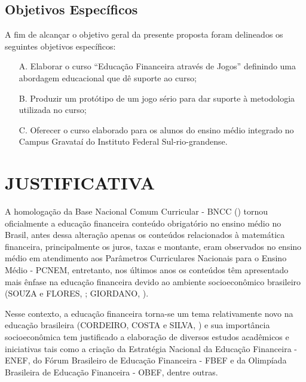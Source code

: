 \subsection{Objetivos Específicos}
A fim de alcançar o objetivo geral da presente proposta foram delineados os seguintes objetivos específicos:

\begin{enumerate}
    \item [A.] Elaborar o curso “Educação Financeira através de Jogos” definindo uma abordagem educacional que dê suporte ao curso;
    \item [B.] Produzir um protótipo de um jogo sério para dar suporte à metodologia utilizada no curso;
    \item [C.] Oferecer o curso elaborado para os alunos do ensino médio integrado no Campus Gravataí do Instituto Federal Sul-rio-grandense.
\end{enumerate}

\section{JUSTIFICATIVA}
A homologação da Base Nacional Comum Curricular - BNCC (\citeyear{bncc2018}) tornou oficialmente a educação financeira conteúdo obrigatório no ensino médio no Brasil, antes dessa alteração apenas os conteúdos relacionados à matemática financeira, principalmente os juros, taxas e montante, eram observados no ensino médio em atendimento aos Parâmetros Curriculares Nacionais para o Ensino Médio - PCNEM, entretanto, nos últimos anos os conteúdos têm apresentado mais ênfase na educação financeira devido ao ambiente socioeconômico brasileiro (SOUZA e FLORES, \citeyear{souza-flores2018}; GIORDANO, \citeyear{giordano2020}).

Nesse contexto, a educação financeira torna-se um tema relativamente novo na educação brasileira (CORDEIRO, COSTA e SILVA, \citeyear{cordeiro-costa-silva2018}) e sua importância socioeconômica tem justificado a elaboração de diversos estudos acadêmicos e iniciativas tais como a criação da Estratégia Nacional da Educação Financeira - ENEF, do Fórum Brasileiro de Educação Financeira - FBEF e da Olimpíada Brasileira de Educação Financeira - OBEF, dentre outras.

